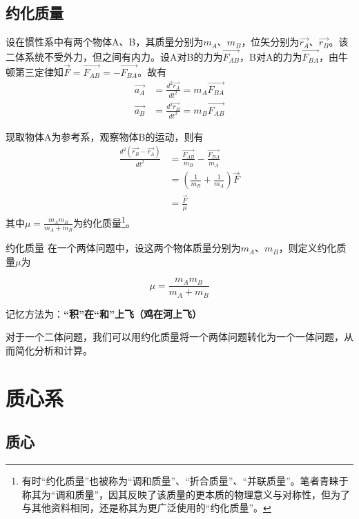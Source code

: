 \subsection{约化质量}
\label{s_yhzl}

设在惯性系中有两个物体A、B，其质量分别为$m_A$、$m_B$，位矢分别为$\vec{r_A}$、$\vec{r_B}$。该二体系统不受外力，但之间有内力。设A对B的力为$\vec{F_{AB}}$，B对A的力为$\vec{F_{BA}}$，由牛顿第三定律知$\vec{F} = \vec{F_{AB}} = - \vec{F_{BA}}$。故有
\begin{subequations}
\begin{align*}
\vec{a_A} &= \frac{d^2 \vec{r_A}}{d t^2} = m_A \vec{F_{BA}}  \\
\vec{a_B} &= \frac{d^2 \vec{r_B}}{d t^2} = m_B \vec{F_{AB}}  
\end{align*}
\end{subequations}

现取物体A为参考系，观察物体B的运动，则有
\begin{subequations}
\begin{align*}
\frac{d^2 (\vec{r_B} - \vec{r_A})}{d t^2} &= \frac{\vec{F_{AB}}}{m_B} - \frac{\vec{F_{BA}}}{m_A} \\
&= (\frac{1}{m_B} + \frac{1}{m_A}) \vec{F} \\
&= \frac{\vec{F}}{\mu}
\end{align*}
\end{subequations}
其中$\mu = \frac{m_A m_B}{m_A + m_B}$为约化质量\footnote{有时“约化质量”也被称为“调和质量”、“折合质量”、“并联质量”。笔者青睐于称其为“调和质量”，因其反映了该质量的更本质的物理意义与对称性，但为了与其他资料相同，还是称其为更广泛使用的“约化质量”。}。

\begin{defi}{约化质量}{}
在一个两体问题中，设这两个物体质量分别为$m_A$、$m_B$，则定义约化质量$\mu$为

$$\mu = \frac{m_A m_B}{m_A + m_B}$$

记忆方法为：\textbf{“积”在“和”上飞（鸡在河上飞）}
\end{defi}

对于一个二体问题，我们可以用约化质量将一个两体问题转化为一个一体问题，从而简化分析和计算。

\section{质心系}

\subsection{质心}

